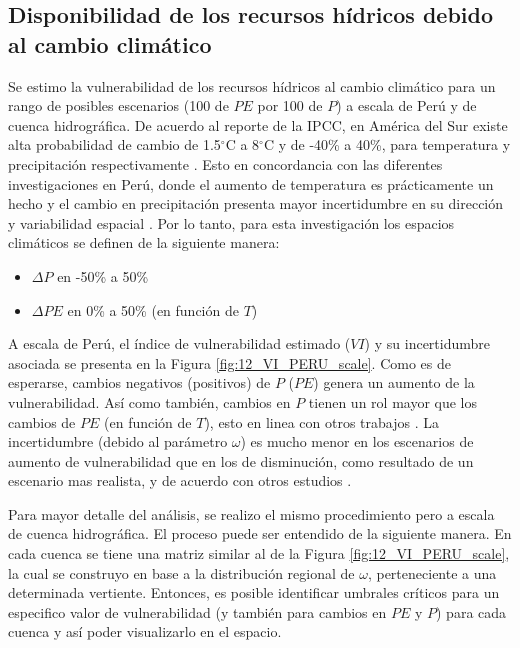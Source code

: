 \documentclass[12pt]{article}
\begin{document}
\subsection{Disponibilidad de los recursos hídricos debido al cambio climático}

Se estimo la vulnerabilidad de los recursos hídricos al cambio climático para un rango de posibles escenarios (100 de $PE$ por 100 de $P$) a escala de Perú y de cuenca hidrográfica. De acuerdo al reporte de la IPCC, en América del Sur existe alta probabilidad de cambio de 1.5$^{\circ}$C a 8$^{\circ}$C y de -40\% a 40\%, para temperatura y precipitación respectivamente
\citep{stocker2013climate}. Esto en concordancia con las diferentes investigaciones en Perú, donde el aumento de temperatura es prácticamente un hecho \citep{vuille2015impact,rosas2016towards,lopez2016recent,vicente2018recent,hunziker2018effects} y el cambio en precipitación presenta mayor incertidumbre en su dirección y variabilidad espacial \citep{zubieta2017spatial,de2017can,Aybar2019}. Por lo tanto, para esta investigación los espacios climáticos se definen de la siguiente manera:

\begin{itemize}

	\item $\Delta P$ en -50\% a 50\%
	\item $\Delta PE$ en 0\% a 50\% (en función de $T$)

\end{itemize}

A escala de Perú, el índice de vulnerabilidad estimado ($VI$) y su incertidumbre asociada se presenta en la Figura \ref{fig:12_VI_PERU_scale}. Como es de esperarse, cambios negativos (positivos) de $P$ ($PE$) genera un aumento de la vulnerabilidad. Así como también, cambios en $P$ tienen un rol mayor que los cambios de $PE$ (en función de $T$), esto en linea con otros trabajos \citep{Singh2015}. La incertidumbre (debido al parámetro $\omega$) es mucho menor en los escenarios de aumento de vulnerabilidad que en los de disminución, como resultado de un escenario mas realista, y de acuerdo con otros estudios \citep{singh2011trading,Singh2015}.



Para mayor detalle del análisis, se realizo el mismo procedimiento pero a escala de cuenca hidrográfica. El proceso puede ser entendido de la siguiente manera. En cada cuenca se tiene una matriz similar al de la Figura \ref{fig:12_VI_PERU_scale}, la cual se construyo en base a la distribución regional de $\omega$, perteneciente a una determinada vertiente. Entonces, es posible identificar umbrales críticos para un especifico valor de vulnerabilidad (y también para cambios en $PE$ y $P$) para cada cuenca y así poder visualizarlo en el espacio.
\end{document}
